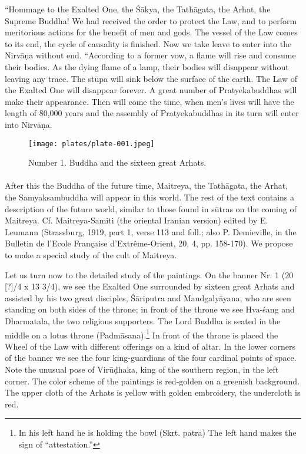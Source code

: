 \documentclass[a4paper, 12pt, oneside]{article}
\begin{document}
``Hommage to the Exalted One, the \'{S}\={a}kya, the Tath\={a}gata, the Arhat, the Supreme Buddha! We had received the order to protect the Law, and to perform meritorious actions for the benefit of men and gods. The vessel of the Law comes to its end, the cycle of causality is finished. Now we take leave to enter into the Nirv\={a}\d{n}a without end. ``According to a former vow, a flame will rise and consume their bodies. As the dying flame of a lamp, their bodies will disappear without leaving any trace. The st\={u}pa will sink below the surface of the earth. The Law of the Exalted One will disappear forever. A great number of Pratyekabuddhas will make their appearance. Then will come the time, when men's lives will have the length of 80,000 years and the assembly of Pratyekabuddhas in its turn will enter into Nirv\={a}\d{n}a.
\clearpage
\begin{figure}[H]
\centering
\texttt{[image: plates/plate-001.jpeg]}
\caption*{Number 1. Buddha and the sixteen great Arhats.}
\end{figure}
\clearpage
\paragraph{}
After this the Buddha of the future time, Maitreya, the Tath\={a}gata, the Arhat, the Samyaksambuddha will appear in this world. The rest of the text contains a description of the future world, similar to those found in s\={u}tras on the coming of Maitreya. Cf. Maitreya-Samiti (the oriental Iranian version) edited by E. Leumann (Strassburg, 1919, part 1, verse 113 and foll.; also P. Demieville, in the Bulletin de l'Ecole Française d'Extrême-Orient, 20, 4, pp. 158-170). We propose to make a special study of the cult of Maitreya.

Let us turn now to the detailed study of the paintings. On the banner Nr. 1 (20 [?]/4 x 13 3/4), we see the Exalted One surrounded by sixteen great Arhats and assisted by his two great disciples, \'{S}\={a}riputra and Maudgaly\={a}yana, who are seen standing on both sides of the throne; in front of the throne we see Hva-\'{s}ang and Dharmatala, the two religious supporters. The Lord Buddha is seated in the middle on a lotus throne (Padm\={a}sana).\footnote{In his left hand he is holding the bowl (Skrt. patra) The left hand makes the sign of ``attestation.''} In front of the throne is placed the Wheel of the Law with different offerings on a kind of altar. In the lower corners of the banner we see the four king-guardians of the four cardinal points of space. Note the unusual pose of Vir\={u}\d{d}haka, king of the southern region, in the left corner. The color scheme of the paintings is red-golden on a greenish background. The upper cloth of the Arhats is yellow with golden embroidery, the undercloth is red.
\end{document}
